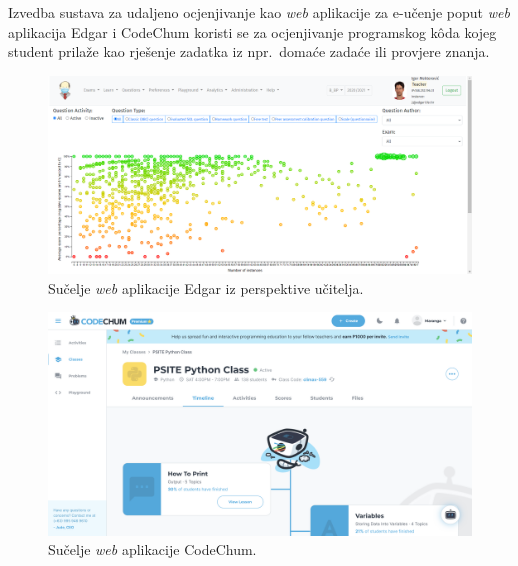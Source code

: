\documentclass[times, utf8, diplomski]{fer}
\begin{document}
Izvedba sustava za udaljeno ocjenjivanje kao \textit{web} aplikacije za e-učenje poput \textit{web} aplikacija Edgar \citep{mekterovic2020building} i CodeChum \citep{maranga2019codechum} koristi se za ocjenjivanje  programskog kôda kojeg student prilaže kao rješenje zadatka iz npr.\ domaće zadaće ili provjere znanja.

\begin{figure}[htb]
	\centering
	\includegraphics[width=\textwidth]{images/edgar-ui.png}
	\caption{
		Sučelje \textit{web} aplikacije Edgar iz perspektive učitelja.
	}
	\label{fig:edgar-ui}
\end{figure}

\begin{figure}[htb]
	\centering
	\includegraphics[width=\textwidth]{images/codechum-ui.png}
	\caption{
		Sučelje \textit{web} aplikacije CodeChum.
	}
	\label{fig:codechum-ui}
\end{figure}
\end{document}
